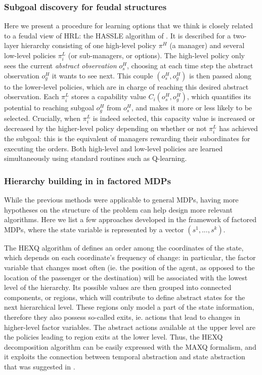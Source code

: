 \documentclass{article}
\begin{document}
\subsubsection{Subgoal discovery for feudal structures}

Here we present a procedure for learning options that we think is closely related to a feudal view of HRL: the HASSLE algorithm of \cite{bakker_hierarchical_2004}. It is described for a two-layer hierarchy consisting of one high-level policy $\pi^H$ (a manager) and several low-level policies $\pi_i^L$ (or sub-managers, or options). The high-level policy only sees the current \textit{abstract observation} $o_s^H$, choosing at each time step the abstract observation $o_g^H$ it wants to see next. This couple $(o_s^H, o_g^H)$ is then passed along to the lower-level policies, which are in charge of reaching this desired abstract observation. Each $\pi_i^L$ stores a capability value $C_i(o_s^H, o_g^H)$, which quantifies its potential to reaching subgoal $o_g^H$ from $o_s^H$, and makes it more or less likely to be selected. Crucially, when $\pi_i^L$ is indeed selected, this capacity value is increased or decreased by the higher-level policy depending on whether or not $\pi_i^L$ has achieved the subgoal: this is the equivalent of managers rewarding their subordinates for executing the orders. Both high-level and low-level policies are learned simultaneously using standard routines such as Q-learning.

\subsubsection{Hierarchy building in in factored MDPs}

While the previous methods were applicable to general MDPs, having more hypotheses on the structure of the problem can help design more relevant algorithms. Here we list a few approaches developed in the framework of factored MDPs, where the state variable is represented by a vector $(s^1, ..., s^k)$.

The HEXQ algorithm of \cite{hengst_discovering_2002} defines an order among the coordinates of the state, which depends on each coordinate's frequency of change: in particular, the factor variable that changes most often (ie. the position of the agent, as opposed to the location of the passenger or the destination) will be associated with the lowest level of the hierarchy. Its possible values are then grouped into connected components, or regions, which will contribute to define abstract states for the next hierarchical level. These regions only model a part of the state information, therefore they also possess so-called exits, ie. actions that lead to changes in higher-level factor variables. The abstract actions available at the upper level are the policies leading to region exits at the lower level. Thus, the HEXQ decomposition algorithm can be easily expressed with the MAXQ formalism, and it exploits the connection between temporal abstraction and state abstraction that was suggested in \cite{dietterich_hierarchical_2000}.
\end{document}
